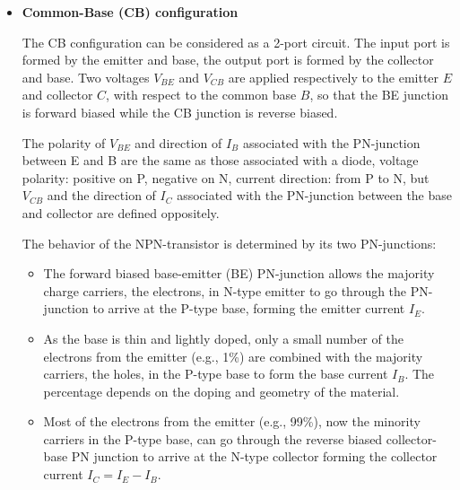 
\begin{itemize}
\item {\bf Common-Base (CB) configuration}

  The CB configuration can be considered as a 2-port circuit. The input
  port is formed by the emitter and base, the output port is formed by 
  the collector and base. Two voltages $V_{BE}$ and $V_{CB}$ are applied 
  respectively to the emitter $E$ and collector $C$, with respect to the 
  common base $B$, so that the BE junction is forward biased while the
  CB junction is reverse biased.



  The polarity of $V_{BE}$ and direction of $I_B$ associated with the
  PN-junction between E and B are the same as those associated with 
  a diode, voltage polarity: positive on P, negative on N, current 
  direction: from P to N, but $V_{CB}$ and the direction of $I_C$ 
  associated with the PN-junction between the base and collector are 
  defined oppositely. 

  The behavior of the NPN-transistor is determined by its two PN-junctions:

  \begin{itemize}
  \item The forward biased base-emitter (BE) PN-junction allows the 
    majority charge carriers, the electrons, in N-type emitter to go 
    through the PN-junction to arrive at the P-type base, forming the 
    emitter current $I_E$.

  \item As the base is thin and lightly doped, only a small number of 
    the electrons from the emitter (e.g., 1\%) are combined with the 
    majority carriers, the holes, in the P-type base to form the base 
    current $I_B$. The percentage depends on the doping and geometry 
    of the material.
    
  \item Most of the electrons from the emitter (e.g., 99\%), now the
    minority carriers in the P-type base, can go through the reverse 
    biased collector-base PN junction to arrive at the N-type collector
    forming the collector current $I_C=I_E-I_B$.

  \end{itemize}


\end{itemize}
